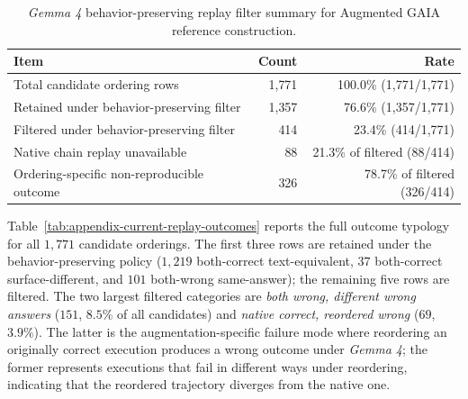 \documentclass{article}
\providecommand{\model}[1]{\emph{#1}}
\begin{document}
\begin{table}[H]
\centering
\scriptsize
\setlength{\tabcolsep}{10pt}
\begin{tabular}{lrr}
\toprule
Item & Count & Rate \\
\midrule
Total candidate ordering rows & 1{,}771 & 100.0\% (1{,}771/1{,}771) \\
Retained under behavior-preserving filter & 1{,}357 & 76.6\% (1{,}357/1{,}771) \\
Filtered under behavior-preserving filter & 414 & 23.4\% (414/1{,}771) \\
\midrule
Native chain replay unavailable & 88 & 21.3\% of filtered (88/414) \\
Ordering-specific non-reproducible outcome & 326 & 78.7\% of filtered (326/414) \\
\bottomrule
\end{tabular}
\vspace{0.05cm}
\caption{\model{Gemma 4} behavior-preserving replay filter summary for Augmented GAIA reference construction.}
\label{tab:appendix-current-replay-filter}
\end{table}

Table~\ref{tab:appendix-current-replay-outcomes} reports the full outcome typology for all $1{,}771$ candidate orderings. The first three rows are retained under the behavior-preserving policy ($1{,}219$ both-correct text-equivalent, $37$ both-correct surface-different, and $101$ both-wrong same-answer); the remaining five rows are filtered. The two largest filtered categories are \emph{both wrong, different wrong answers} ($151$, $8.5\%$ of all candidates) and \emph{native correct, reordered wrong} ($69$, $3.9\%$). The latter is the augmentation-specific failure mode where reordering an originally correct execution produces a wrong outcome under \model{Gemma 4}; the former represents executions that fail in different ways under reordering, indicating that the reordered trajectory diverges from the native one.
\end{document}
